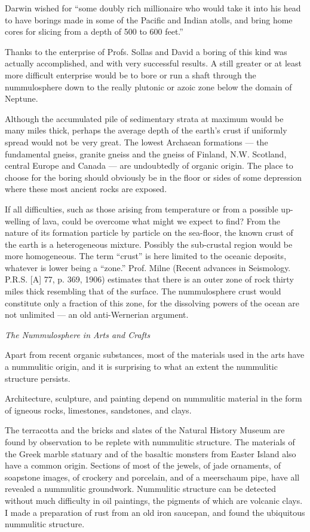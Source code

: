 \documentclass[a4paper, 12pt, oneside]{article}
\begin{document}
Darwin wished for ``some doubly rich millionaire who would take it into his head to have borings made in some of the Pacific and Indian atolls, and bring home cores for slicing from a depth of 500 to 600 feet.''

Thanks to the enterprise of Profs. Sollas and David a boring of this kind was actually accomplished, and with very successful results. A still greater or at least more difficult enterprise would be to bore or run a shaft through the nummulosphere down to the really plutonic or azoic zone below the domain of Neptune.

Although the accumulated pile of sedimentary strata at maximum would be many miles thick, perhaps the average depth of the earth's crust if uniformly spread would not be very great. The lowest Archaean formations --- the fundamental gneiss, granite gneiss and the gneiss of Finland, N.W. Scotland, central Europe and Canada --- are undoubtedly of organic origin. The place to choose for the boring should obviously be in the floor or sides of some depression where these most ancient rocks are exposed.

If all difficulties, such as those arising from temperature or from a possible up-welling of lava, could be overcome what might we expect to find? From the nature of its formation particle by particle on the sea-floor, the known crust of the earth is a heterogeneous mixture. Possibly the sub-crustal region would be more homogeneous. The term ``crust'' is here limited to the oceanic deposits, whatever is lower being a ``zone.'' Prof. Milne (Recent advances in Seismology. P.R.S. [A] 77, p. 369, 1906) estimates that there is an outer zone of rock thirty miles thick resembling that of the surface. The nummulosphere crust would constitute only a fraction of this zone, for the dissolving powers of the ocean are not unlimited --- an old anti-Wernerian argument.

\centerline{\emph{The Nummulosphere in Arts and Crafts}}

Apart from recent organic substances, most of the materials used in the arts have a nummulitic origin, and it is surprising to what an extent the nummulitic structure persists.

Architecture, sculpture, and painting depend on nummulitic material in the form of igneous rocks, limestones, sandstones, and clays.

The terracotta and the bricks and slates of the Natural History Museum are found by observation to be replete with nummulitic structure. The materials of the Greek marble statuary and of the basaltic monsters from Easter Island also have a common origin. Sections of most of the jewels, of jade ornaments, of soapstone images, of crockery and porcelain, and of a meerschaum pipe, have all revealed a nummulitic groundwork. Nummulitic structure can be detected without much difficulty in oil paintings, the pigments of which are volcanic clays. I made a preparation of rust from an old iron saucepan, and found the ubiquitous nummulitic structure.
\end{document}
